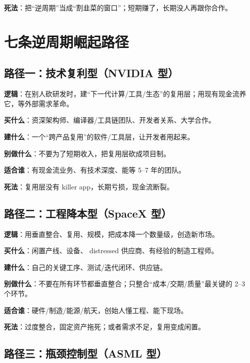 \textbf{死法}：把``逆周期''当成``割韭菜的窗口''；短期赚了，长期没人再跟你合作。

\chapter{七条逆周期崛起路径}\label{ux4e03ux6761ux9006ux5468ux671fux5d1bux8d77ux8defux5f84}

\section{路径一：技术复利型（NVIDIA
型）}\label{ux8defux5f84ux4e00ux6280ux672fux590dux5229ux578bnvidia-ux578b}

\textbf{逻辑}：在别人砍研发时，建``下一代计算/工具/生态''的复用层；用现有现金流养它，等外部需求革命。

\textbf{买什么}：资深架构师、编译器/工具链团队、开发者关系、大学合作。

\textbf{建什么}：一个``跨产品复用''的软件/工具层，让开发者用起来。

\textbf{别做什么}：不要为了短期收入，把复用层砍成项目制。

\textbf{适合谁}：有现金流业务、有技术深度、能等 5--7 年的团队。

\textbf{死法}：复用层没有 killer app，长期亏损，现金流断裂。

\section{路径二：工程降本型（SpaceX
型）}\label{ux8defux5f84ux4e8cux5de5ux7a0bux964dux672cux578bspacex-ux578b}

\textbf{逻辑}：用垂直整合、复用、规模，把成本降一个数量级，创造新市场。

\textbf{买什么}：闲置产线、设备、 distressed
供应商、有经验的制造工程师。

\textbf{建什么}：自己的关键工序、测试/迭代闭环、供应链。

\textbf{别做什么}：不要在所有环节都垂直整合；只整合``成本/交期/质量''最关键的
2--3 个环节。

\textbf{适合谁}：硬件/制造/能源/航天，创始人懂工程、能下现场。

\textbf{死法}：过度整合，固定资产拖死；或者需求不足，复用变成闲置。

\section{路径三：瓶颈控制型（ASML
型）}\label{ux8defux5f84ux4e09ux74f6ux9888ux63a7ux5236ux578basml-ux578b}

